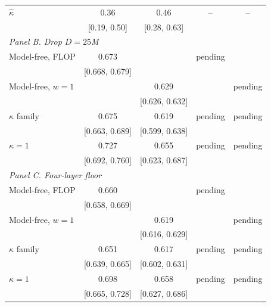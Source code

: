 \begin{table}[tp]
\begin{tabular*}{\textwidth}{@{\extracolsep{\fill}}lcccc@{}}
$\hat\kappa$ & 0.36 & 0.46 & -- & -- \\
 & [0.19, 0.50] & [0.28, 0.63] &  &  \\
\multicolumn{5}{l}{\emph{Panel B. Drop $D=25$M}} \\
Model-free, FLOP & 0.673 &  & pending &  \\
 & [0.668, 0.679] &  &  &  \\
Model-free, $w=1$ &  & 0.629 &  & pending \\
 &  & [0.626, 0.632] &  &  \\
$\kappa$ family & 0.675 & 0.619 & pending & pending \\
 & [0.663, 0.689] & [0.599, 0.638] &  &  \\
$\kappa=1$ & 0.727 & 0.655 & pending & pending \\
 & [0.692, 0.760] & [0.623, 0.687] &  &  \\
\multicolumn{5}{l}{\emph{Panel C. Four-layer floor}} \\
Model-free, FLOP & 0.660 &  & pending &  \\
 & [0.658, 0.669] &  &  &  \\
Model-free, $w=1$ &  & 0.619 &  & pending \\
 &  & [0.616, 0.629] &  &  \\
$\kappa$ family & 0.651 & 0.617 & pending & pending \\
 & [0.639, 0.665] & [0.602, 0.631] &  &  \\
$\kappa=1$ & 0.698 & 0.658 & pending & pending \\
 & [0.665, 0.728] & [0.627, 0.686] &  &  \\
\bottomrule
\end{tabular*}


\end{table}
